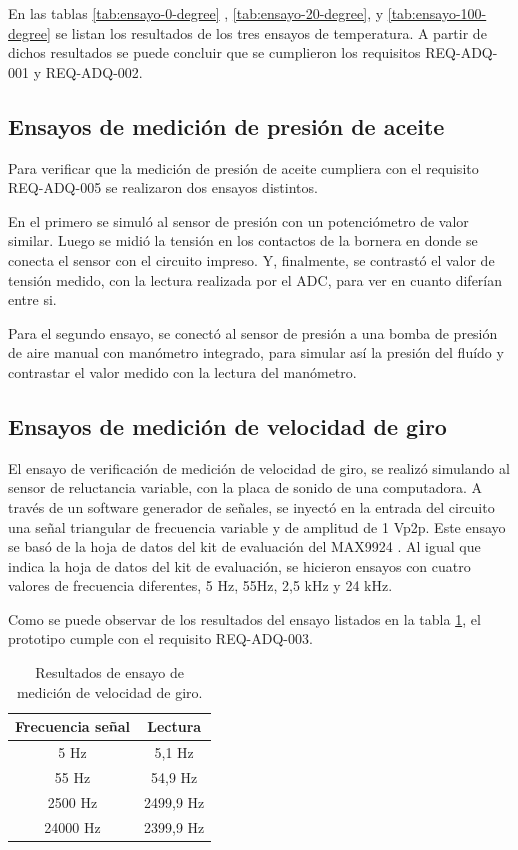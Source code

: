 En las tablas \ref{tab:ensayo-0-degree} , \ref{tab:ensayo-20-degree}, y \ref{tab:ensayo-100-degree} se listan los resultados de los tres ensayos de temperatura. A partir de dichos resultados se puede concluir que se cumplieron los requisitos REQ-ADQ-001 y REQ-ADQ-002.

\subsection{Ensayos de medición de presión de aceite}

Para verificar que la medición de presión de aceite cumpliera con el requisito REQ-ADQ-005 se realizaron dos ensayos distintos.

En el primero se simuló al sensor de presión con un potenciómetro de valor similar. Luego se midió la tensión en los contactos de la bornera en donde se conecta el sensor con el circuito impreso. Y, finalmente, se contrastó el valor de tensión medido, con la lectura realizada por el ADC, para ver en cuanto diferían entre si.

Para el segundo ensayo, se conectó al sensor de presión a una bomba de presión de aire manual con manómetro integrado, para simular así la presión del fluído y contrastar el valor medido con la lectura del manómetro.

\subsection{Ensayos de medición de velocidad de giro}

El ensayo de verificación de medición de velocidad de giro, se realizó simulando al sensor de reluctancia variable, con la placa de sonido de una computadora. A través de un software generador de señales, se inyectó en la entrada del circuito una señal triangular de frecuencia variable y de amplitud de 1 Vp2p. Este ensayo se basó de la hoja de datos del kit de evaluación del MAX9924 \cite{max9924evk}. Al igual que indica la hoja de datos del kit de evaluación, se hicieron ensayos con cuatro valores de frecuencia diferentes, 5 Hz, 55Hz, 2,5 kHz y 24 kHz.

Como se puede observar de los resultados del ensayo listados en la tabla \ref{tab:ensayo-rpm}, el prototipo cumple con el requisito REQ-ADQ-003.

\begin{table}[htpb]
	\centering
	\caption{Resultados de ensayo de medición de velocidad de giro.}
	\centering
	\begin{tabular}{c c}    
		\toprule
		\textbf{Frecuencia señal }     & \textbf{Lectura} \\
		\midrule
		5 Hz		&   5,1 Hz \\
		55 Hz		&   54,9 Hz \\
		2500 Hz		&   2499,9 Hz \\
		24000 Hz	&   2399,9 Hz \\
		\bottomrule
	\end{tabular}
	\label{tab:ensayo-rpm}
\end{table}

